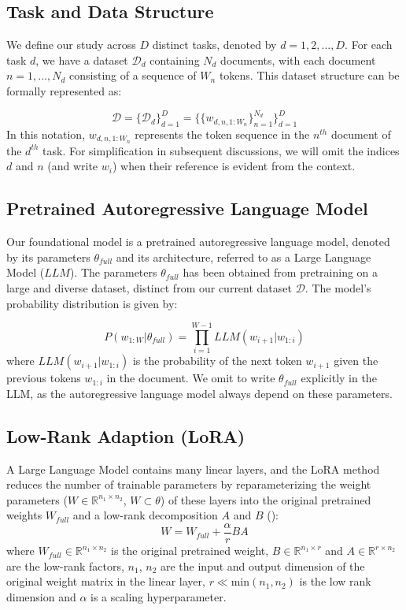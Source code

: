 \documentclass[fullpaper]{nldl}
\newcommand{\R}{\mathbb{R}}
\begin{document}
\subsection{Task and Data Structure}
We define our study across $D$ distinct tasks, denoted by $d=1,2,...,D$. For each task $d$, we have a dataset $\mathcal{D}_d$ containing $N_d$ documents, with each document $n=1,..., N_d$ consisting of a sequence of $W_n$ tokens. This dataset structure can be formally represented as:

\begin{equation} \label{eq:data}
\mathcal{D} = \{ \mathcal{D}_d \}_{d=1}^D  =  \{ \{ w_{d,n,1:W_n} \}_{n=1}^{N_d} \}_{d=1}^D
\end{equation}
%
In this notation, $w_{d,n,1:W_n}$ represents the token sequence in the $n^{th}$ document of the $d^{th}$ task. For simplification in subsequent discussions, we will omit the indices $d$ and $n$ (and write $w_i$) when their reference is evident from the context.

\subsection{Pretrained Autoregressive Language Model}
Our foundational model is a pretrained autoregressive language model, denoted by its parameters $\theta_{full}$ and its architecture, referred to as a Large Language Model ($LLM$). The parameters $\theta_{full}$ has been obtained from pretraining on a large and diverse dataset, distinct from our current dataset $\mathcal{D}$. 
The model's probability distribution is given by:

\begin{equation} \label{eq:LLMprob}
P(w_{1:W} | \theta_{full}) = \prod_{i=1}^{W-1} LLM(w_{i+1} | w_{1:i})
\end{equation}
%
where $LLM(w_{i+1} | w_{1:i})$ is the probability of the next token $w_{i+1}$ given the previous tokens $w_{1:i}$ in the document.
We omit to write $\theta_{full}$ explicitly in the LLM, as the autoregressive language model always depend on these parameters.

\subsection{Low-Rank Adaption (LoRA)}
A Large Language Model contains many linear layers, and the LoRA method reduces the number of trainable parameters by reparameterizing the weight parameters ($W \in \R^{n_1 \times n_2}$, $W \subset \theta$) of these layers into the original pretrained weights $W_{full}$ and a low-rank decomposition $A$ and $B$ (\cite{hayou_lora_2024}):
\begin{equation} \label{eq:LoRA}
    W = W_{full} + \frac{\alpha}{r} BA 
\end{equation}
%
where 
$W_{full} \in \R^{n_1 \times n_2}$ is the original pretrained weight, 
$B \in \R^{n_1 \times r}$ and $A \in \R^{r \times n_2}$ are the low-rank factors, 
$n_1$, $n_2$ are the input and output dimension of the original weight matrix in the linear layer,
$r \ll \text{min}(n_1, n_2)$ is the low rank dimension 
and $\alpha$ is a scaling hyperparameter.
\end{document}
